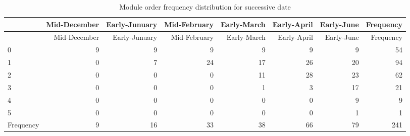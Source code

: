 \documentclass[]{article}
\begin{document}
\begin{longtable}[]{@{}lrrrrrrr@{}}
\caption{Module order frequency distribution for successive
date}\tabularnewline
\toprule
& Mid-December & Early-Junuary & Mid-February & Early-March &
Early-April & Early-June & Frequency\tabularnewline
\midrule
\endfirsthead
\toprule
& Mid-December & Early-Junuary & Mid-February & Early-March &
Early-April & Early-June & Frequency\tabularnewline
\midrule
\endhead
0 & 9 & 9 & 9 & 9 & 9 & 9 & 54\tabularnewline
1 & 0 & 7 & 24 & 17 & 26 & 20 & 94\tabularnewline
2 & 0 & 0 & 0 & 11 & 28 & 23 & 62\tabularnewline
3 & 0 & 0 & 0 & 1 & 3 & 17 & 21\tabularnewline
4 & 0 & 0 & 0 & 0 & 0 & 9 & 9\tabularnewline
5 & 0 & 0 & 0 & 0 & 0 & 1 & 1\tabularnewline
Frequency & 9 & 16 & 33 & 38 & 66 & 79 & 241\tabularnewline
\bottomrule
\end{longtable}
\end{document}
